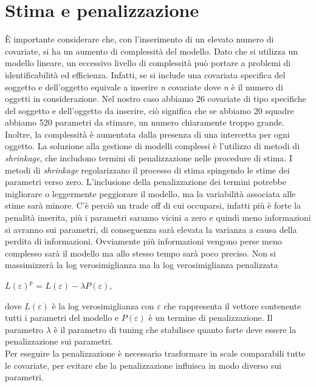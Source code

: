 \section{Stima e penalizzazione}
È importante considerare che, con l'inserimento di un elevato numero di covariate, si ha un aumento di complessità del modello. Dato che si utilizza un modello lineare, un eccessivo livello di complessità può portare a problemi di identificabilità ed efficienza. Infatti, se si include una covariata specifica del soggetto e dell'oggetto equivale a inserire \emph{n} covariate dove \emph{n} è il numero di oggetti in considerazione. Nel nostro caso abbiamo 26 covariate di tipo specifiche del soggetto e dell'oggetto da inserire, ciò significa che se abbiamo 20 squadre abbiamo 520 parametri da stimare, un numero chiaramente troppo grande. Inoltre, la complessità è aumentata dalla presenza di una intercetta per ogni oggetto. La soluzione alla gestione di modelli complessi è l'utilizzo di metodi di \emph{shrinkage}, che includono termini di penalizzazione nelle procedure di stima. I metodi di \emph{shrinkage} \autocite{copas1983regression} regolarizzano il processo di stima spingendo le stime dei parametri verso zero.
L'inclusione della penalizzazione dei termini potrebbe migliorare o leggermente peggiorare il modello, ma la variabilità associata alle stime sarà minore. C'è perciò un trade off di cui occuparsi, infatti più è forte la penalità inserita, più i parametri saranno vicini a zero e quindi meno informazioni si avranno sui parametri, di conseguenza sarà elevata la varianza a causa della perdita di informazioni. Ovviamente più informazioni vengono perse meno complesso sarà il modello ma allo stesso tempo sarà poco preciso. Non si massimizzerà la log verosimiglianza ma la log verosimiglianza penalizzata 
\begin{center}
	$ L(\varepsilon)^{p}$ = $L(\varepsilon) - \lambda P(\varepsilon)$,
\end{center}
dove $L(\varepsilon)$ è la log verosimiglianza con $\varepsilon$ che rappresenta il vettore contenente tutti i parametri del modello e $P(\varepsilon)$ è un termine di penalizzazione. Il parametro $\lambda$ è il parametro di tuning che stabilisce quanto forte deve essere la penalizzazione sui parametri. \\
Per eseguire la penalizzazione è necessario trasformare in scale comparabili tutte le covariate, per evitare che la penalizzazione influisca in modo diverso sui parametri.\\
